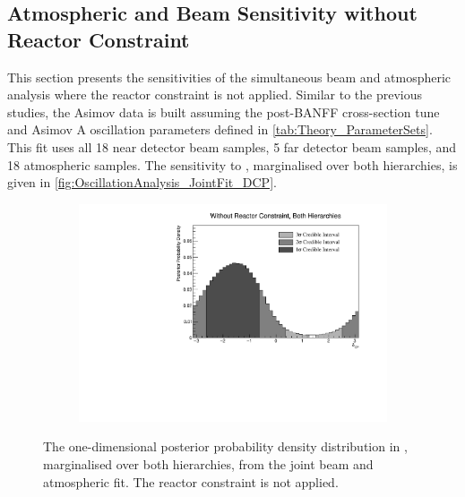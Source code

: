 \clearpage
\subsection{Atmospheric and Beam Sensitivity without Reactor Constraint}
\label{sec:OscillationAnalysis_JointFit}

This section presents the sensitivities of the simultaneous beam and atmospheric analysis where the reactor constraint is not applied. Similar to the previous studies, the Asimov data is built assuming the post-BANFF cross-section tune and Asimov A oscillation parameters defined in \autoref{tab:Theory_ParameterSets}. This fit uses all 18 near detector beam samples, 5 far detector beam samples, and 18 atmospheric samples. The sensitivity to , marginalised over both hierarchies, is given in \autoref{fig:OscillationAnalysis_JointFit_DCP}.

\begin{figure}[h]
  \begin{subfigure}[t]{0.98\textwidth}
    \includegraphics[width=\textwidth, trim={0mm 0mm 0mm 0mm}, clip,page=1]{Figures/OA/JointFit/Contours_1D_dcp_BH_1_woRC_UnSmeared_CredibleInterval.pdf}
  \end{subfigure}
  \caption{The one-dimensional posterior probability density distribution in , marginalised over both hierarchies, from the joint beam and atmospheric fit. The reactor constraint is not applied.}
  \label{fig:OscillationAnalysis_JointFit_DCP}
\end{figure}

